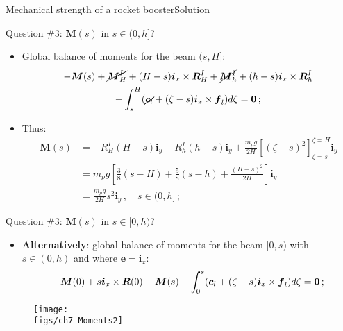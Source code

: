 \documentclass{beamer}
\newcommand{\id}{d}
\newcommand{\cj}{c}
\newcommand{\cv}{{\boldsymbol\cj}}
\newcommand{\xj}{x}
\newcommand{\yj}{y}
\newcommand{\ej}{e}
\renewcommand{\ij}{i}
\newcommand{\ev}{{\boldsymbol\ej}}
\newcommand{\iv}{{\boldsymbol\ij}}
\newcommand{\fj}{f}
\newcommand{\Rj}{R}
\newcommand{\fv}{{\boldsymbol\fj}}
\newcommand{\Rv}{{\boldsymbol\Rj}}
\newcommand{\Fresj}{R}
\newcommand{\Mresj}{M}
\newcommand{\Fres}{{\boldsymbol\Fresj}}
\newcommand{\Mres}{{\boldsymbol\Mresj}}
\newcommand{\bzero}{{\bf 0}}
\begin{document}
\begin{frame}{Mechanical strength of a rocket booster}{Solution}
\begin{overprint}
\vskip-20pt
\begin{exampleblock}{Question \#3: $\Mres(s)$ in $s\in(0,h]$?}
\begin{itemize}
\item Global balance of moments for the beam $(s,H]$:
\begin{multline*}
-\Mres(s)+\cancel{\Mres_H^I}+(H-s)\iv_\xj\times\Rv_H^I +\cancel{\Mres_h^I}+(h-s)\iv_\xj\times\Rv_h^I \\
+\int_s^H(\cancel{\cv_l}+(\zeta-s)\iv_\xj\times\fv_l) \id\zeta=\bzero\,;
\end{multline*}
\item Thus:
\begin{displaymath}
\begin{split}
\!\!\!\!\!\!\!\!\!\!\!\!\!\Mres(s) &= -\Rj_H^I(H-s)\iv_\yj-\Rj_h^I(h-s)\iv_\yj+\frac{m_p g}{2H}\left[(\zeta-s)^2\right]_{\zeta=s}^{\zeta=H}\iv_\yj \\
&=m_p g\left[\frac{3}{8}(s-H)+\frac{5}{8}(s-h)+\frac{(H-s)^2}{2H}\right]\iv_\yj \\
&=\frac{m_p g}{2H}s^2\iv_\yj\,,\quad s\in(0,h]\,;
\end{split}
\end{displaymath}
\end{itemize}
\end{exampleblock}

\vskip-20pt
\begin{exampleblock}{Question \#3: $\Mres(s)$ in $s\in[0,h)$?}
\begin{itemize}
\item {\bf Alternatively}: global balance of moments for the beam $[0,s)$ with $s\in(0,h)$ and where $\ev=\iv_\xj$:
\begin{displaymath}
-\Mres(0)+s\iv_\xj\times\Fres(0)+\Mres(s)+\int_0^s(\cv_l+(\zeta-s)\iv_\xj\times\fv_l) \id\zeta=\bzero\,;
\end{displaymath}
\end{itemize}
\end{exampleblock}
\begin{figure}
\centering\texttt{[image: \\figs/ch7-Moments2]}
\end{figure}


\end{overprint}
\end{frame}
\end{document}
